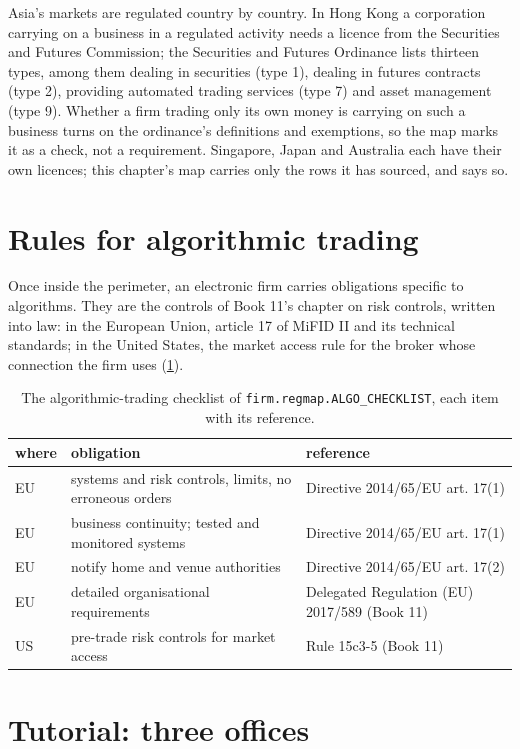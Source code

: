 Asia's markets are regulated country by country. In Hong Kong a corporation carrying on a business in a regulated activity needs a licence from
the Securities and Futures Commission; the Securities and Futures Ordinance lists thirteen types, among them dealing in securities (type 1),
dealing in futures contracts (type 2), providing automated trading services (type 7) and asset management (type 9). Whether a firm trading only its
own money is carrying on such a business turns on the ordinance's definitions and exemptions, so the map marks it as a check, not a requirement.
Singapore, Japan and Australia each have their own licences; this chapter's map carries only the rows it has sourced, and says so.

\section{Rules for algorithmic trading}

Once inside the perimeter, an electronic firm carries obligations specific to algorithms. They are the controls of Book 11's chapter on risk
controls, written into law: in the European Union, article 17 of MiFID II and its technical standards; in the United States, the market access
rule for the broker whose connection the firm uses (\cref{tab:fm:regulators-and-licences:algo}).

\begin{table}[ht]
\centering\small
\begin{tabular}{llp{6.2cm}}
\toprule
where & obligation & reference \\
\midrule
EU & systems and risk controls, limits, no erroneous orders & Directive 2014/65/EU art. 17(1) \\
EU & business continuity; tested and monitored systems & Directive 2014/65/EU art. 17(1) \\
EU & notify home and venue authorities & Directive 2014/65/EU art. 17(2) \\
EU & detailed organisational requirements & Delegated Regulation (EU) 2017/589 (Book 11) \\
US & pre-trade risk controls for market access & Rule 15c3-5 (Book 11) \\
\bottomrule
\end{tabular}
\caption{The algorithmic-trading checklist of \texttt{firm.regmap.ALGO\_CHECKLIST}, each item with its reference.}\label{tab:fm:regulators-and-licences:algo}
\end{table}

\section{Tutorial: three offices}\label{tut:fm:regulators-and-licences:tut}

